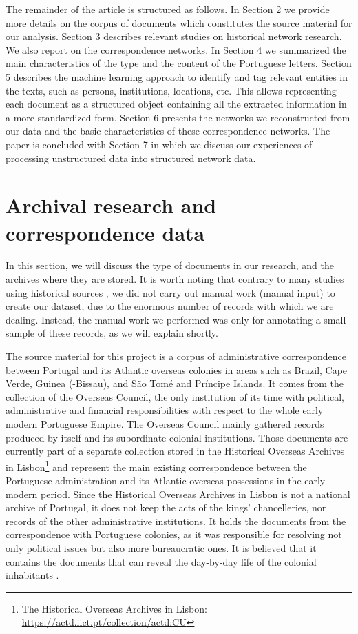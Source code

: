 \documentclass{article}
\begin{document}
The remainder of the article is structured as follows. In Section 2 we provide more details on the corpus of documents which constitutes the source material for our analysis. Section 3 describes relevant studies on historical network research. We also report on the correspondence networks. In Section 4 we summarized  the main characteristics of the type and the content of the Portuguese letters. Section 5 describes the machine learning approach to identify and tag relevant entities in the texts, such as persons, institutions, locations, etc. This allows representing each document as a structured object containing all the extracted information in a more standardized form. Section 6 presents the networks we reconstructed from our data and the basic characteristics of these correspondence networks. The paper is concluded with Section 7 in which we discuss our experiences of processing unstructured data into structured network data.

\section{Archival research and correspondence data}

In this section, we will discuss the type of documents in our research, and the archives where they are stored. It is worth noting that contrary to many studies using historical sources \cite{franzosi_narrative_1998,padgett_robust_1993,mclean_art_2007,mcshane_visualising_2018}, we did not carry out manual work (manual input) to create our dataset, due to the enormous number of records with which we are dealing. Instead, the manual work we performed was only for annotating a small sample of these records, as we will explain shortly. 

The source material for this project is a corpus of administrative correspondence between Portugal and its Atlantic overseas colonies in areas such as Brazil, Cape Verde, Guinea (-Bissau), and São Tomé and Príncipe Islands. It comes from the collection of the Overseas Council, the only institution of its time with political, administrative and financial responsibilities with respect to the whole early modern Portuguese Empire. The Overseas Council mainly gathered records produced by itself and its subordinate colonial institutions. Those documents are currently part of a separate collection stored in the Historical Overseas Archives in Lisbon\footnote{The Historical Overseas Archives in Lisbon: \url{https://actd.iict.pt/collection/actd:CU}} and represent the main existing correspondence between the Portuguese administration and its Atlantic overseas possessions in the early modern period. Since the Historical Overseas Archives in Lisbon is not a national archive of Portugal, it does not keep the acts of the kings' chancelleries, nor records of the other administrative institutions. It holds the documents from the correspondence with Portuguese colonies, as it was responsible for resolving not only political issues but also more bureaucratic ones. It is believed that it contains the documents that can reveal the day-by-day life of the colonial inhabitants \cite{bellotto_arquivos_2004}.
\end{document}
